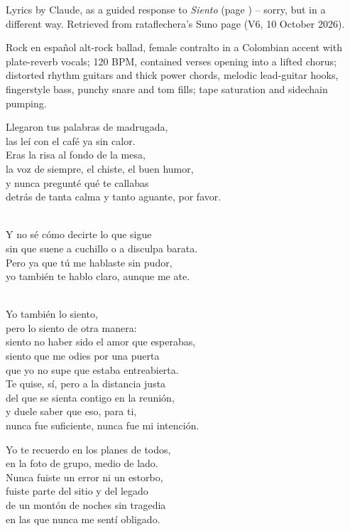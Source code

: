 
\begin{notes}
Lyrics by Claude, as a guided response to \emph{Siento} (page \pageref{sec:siento}) -- sorry, but in a different way. Retrieved from rataflechera's Suno page (V6, 10 October 2026).
\end{notes}
\begin{style}
Rock en español alt-rock ballad, female contralto in a Colombian accent with plate-reverb vocals; 120 BPM, contained verses opening into a lifted chorus; distorted rhythm guitars and thick power chords, melodic lead-guitar hooks, fingerstyle bass, punchy snare and tom fills; tape saturation and sidechain pumping.
\end{style}
\begin{lyrics}
Llegaron tus palabras de madrugada,\\
las leí con el café ya sin calor.\\
Eras la risa al fondo de la mesa,\\
la voz de siempre, el chiste, el buen humor,\\
y nunca pregunté qué te callabas\\
detrás de tanta calma y tanto aguante, por favor.

\\
Y no sé cómo decirte lo que sigue\\
sin que suene a cuchillo o a disculpa barata.\\
Pero ya que tú me hablaste sin pudor,\\
yo también te hablo claro, aunque me ate.

\\
Yo también lo siento,\\
pero lo siento de otra manera:\\
siento no haber sido el amor que esperabas,\\
siento que me odies por una puerta\\
que yo no supe que estaba entreabierta.\\
Te quise, sí, pero a la distancia justa\\
del que se sienta contigo en la reunión,\\
y duele saber que eso, para ti,\\
nunca fue suficiente, nunca fue mi intención.

Yo te recuerdo en los planes de todos,\\
en la foto de grupo, medio de lado.\\
Nunca fuiste un error ni un estorbo,\\
fuiste parte del sitio y del legado\\
de un montón de noches sin tragedia\\
en las que nunca me sentí obligado.


\end{lyrics}

